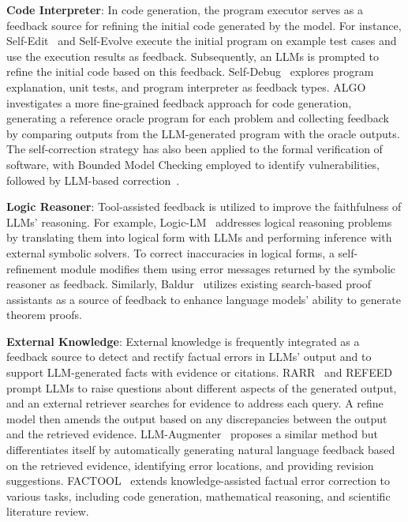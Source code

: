 \documentclass[a4paper,oneside]{book}
\begin{document}
\textbf{Code Interpreter}: In code generation, the program executor serves as a feedback source for refining the initial code generated by the model. For instance, Self-Edit~\cite{zhang2023selfedit} and Self-Evolve execute the initial program on example test cases and use the execution results as feedback. Subsequently, an LLMs is prompted to refine the initial code based on this feedback. Self-Debug~\cite{chen2023teaching} explores program explanation, unit tests, and program interpreter as feedback types. ALGO~\cite{zhang2023algo} investigates a more fine-grained feedback approach for code generation, generating a reference oracle program for each problem and collecting feedback by comparing outputs from the LLM-generated program with the oracle outputs. The self-correction strategy has also been applied to the formal verification of software, with Bounded Model Checking employed to identify vulnerabilities, followed by LLM-based correction~\cite{charalambous2023new}.

\textbf{Logic Reasoner}: Tool-assisted feedback is utilized to improve the faithfulness of LLMs' reasoning. For example, Logic-LM~\cite{pan2023logiclm} addresses logical reasoning problems by translating them into logical form with LLMs and performing inference with external symbolic solvers. To correct inaccuracies in logical forms, a self-refinement module modifies them using error messages returned by the symbolic reasoner as feedback. Similarly, Baldur~\cite{first2023baldur} utilizes existing search-based proof assistants as a source of feedback to enhance language models' ability to generate theorem proofs.

\textbf{External Knowledge}: External knowledge is frequently integrated as a feedback source to detect and rectify factual errors in LLMs' output and to support LLM-generated facts with evidence or citations. RARR~\cite{gao2023rarr} and REFEED~\cite{yu2023improving} prompt LLMs to raise questions about different aspects of the generated output, and an external retriever searches for evidence to address each query. A refine model then amends the output based on any discrepancies between the output and the retrieved evidence. LLM-Augmenter~\cite{peng2023check} proposes a similar method but differentiates itself by automatically generating natural language feedback based on the retrieved evidence, identifying error locations, and providing revision suggestions. FACTOOL~\cite{chern2023factool} extends knowledge-assisted factual error correction to various tasks, including code generation, mathematical reasoning, and scientific literature review.
\end{document}
